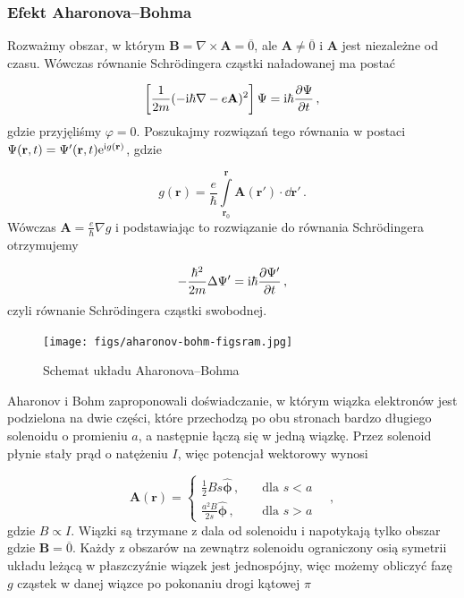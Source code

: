 \documentclass{myclass}
\begin{document}
\subsubsection{Efekt Aharonova--Bohma}

Rozważmy obszar, w którym \(\mathbf{B}=\nabla\times\mathbf{A}=\overline{0}\), ale
\(\mathbf{A}\neq\overline{0}\) i \(\mathbf{A}\) jest niezależne od czasu. Wówczas równanie
Schr{\"o}dingera cząstki naładowanej ma postać

\begin{equation*}
\left[\frac{1}{2m}(-\mathrm{i}\hbar\nabla-e\mathbf{A})^2\right]\Psi=\mathrm{i}\hbar\pdv{\Psi}{t}\,,
\end{equation*}
gdzie przyjęliśmy \(\varphi= 0\). Poszukajmy rozwiązań tego równania w postaci
\(\Psi(\mathbf{r},t)=\Psi'(\mathbf{r},t)\mathrm{e}^{\mathrm{i} g(\mathbf{r})}\), gdzie

\begin{equation*}
g(\mathbf{r})=\frac{e}{\hbar}\int\limits_{\mathbf{r}_0}^\mathbf{r}\mathbf{A}(\mathbf{r}')\cdot\dd{\mathbf{r}'}\,.
\end{equation*}
Wówczas \(\mathbf{A}=\frac{e}{\hbar}\nabla g\) i podstawiając to rozwiązanie do równania
Schr{\"o}dingera otrzymujemy

\begin{equation*}
-\frac{\hbar^2}{2m}\Delta\Psi'=\mathrm{i}\hbar\pdv{\Psi'}{t}\,,
\end{equation*}
czyli równanie Schr{\"o}dingera cząstki swobodnej. 

\begin{figure}[ht]
    \centering
    \texttt{[image: figs/aharonov-bohm-figsram.jpg]}
    \caption{Schemat układu Aharonova--Bohma}
    \label{aharonov-bohm}
\end{figure}

Aharonov i Bohm zaproponowali doświadczanie, w którym wiązka elektronów jest podzielona na dwie
części, które przechodzą po obu stronach bardzo długiego solenoidu o promieniu \(a\), a następnie
łączą się w jedną wiązkę. Przez solenoid płynie stały prąd o natężeniu \(I\), więc potencjał
wektorowy wynosi

\begin{equation*}
\mathbf{A}(\mathbf{r})=\begin{cases}
\frac{1}{2}Bs\hat{\boldsymbol{\phi}}\,,&\quad\text{dla \(s<a\)}\\
\frac{a^2B}{2s}\hat{\boldsymbol{\phi}}\,,&\quad\text{dla \(s>a\)}
\end{cases}\quad,
\end{equation*}
gdzie \(B\propto I\). Wiązki są trzymane z dala od solenoidu i napotykają tylko obszar gdzie
\(\mathbf{B}=\overline{0}\). Każdy z obszarów na zewnątrz solenoidu ograniczony osią symetrii układu
leżącą w płaszczyźnie wiązek jest jednospójny, więc możemy obliczyć fazę \(g\) cząstek w danej
wiązce po pokonaniu drogi kątowej \(\pi\)
\end{document}
